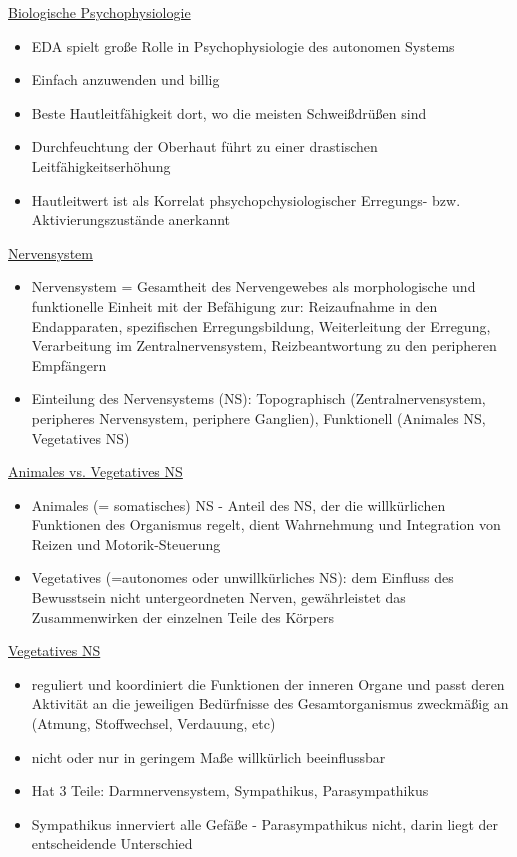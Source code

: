 \documentclass[a4paper,10pt,oneside]{article}
\begin{document}
\underline{Biologische Psychophysiologie} \\
 	\begin{itemize}
 		\item EDA spielt große Rolle in Psychophysiologie des autonomen Systems
 		\item Einfach anzuwenden und billig
 		\item Beste Hautleitfähigkeit dort, wo die meisten Schweißdrüßen sind 
 		\item Durchfeuchtung der Oberhaut führt zu einer drastischen Leitfähigkeitserhöhung
 		\item Hautleitwert ist als Korrelat phsychopchysiologischer Erregungs- bzw. Aktivierungszustände anerkannt
 	\end{itemize}
 		
\underline{Nervensystem} \\
 	\begin{itemize}
 		\item Nervensystem = Gesamtheit des Nervengewebes als morphologische und funktionelle Einheit mit der Befähigung zur: Reizaufnahme in den Endapparaten, spezifischen Erregungsbildung, Weiterleitung der Erregung, Verarbeitung im Zentralnervensystem, Reizbeantwortung zu den peripheren Empfängern
 		\item Einteilung des Nervensystems (NS): Topographisch (Zentralnervensystem, peripheres Nervensystem, periphere Ganglien), Funktionell (Animales NS, Vegetatives NS)
 	\end{itemize}

\underline{Animales vs. Vegetatives NS} \\
	\begin{itemize}
		\item Animales (= somatisches) NS - Anteil des NS, der die willkürlichen Funktionen des Organismus regelt, dient Wahrnehmung und Integration von Reizen und Motorik-Steuerung
		\item Vegetatives (=autonomes oder unwillkürliches NS): dem Einfluss des Bewusstsein nicht untergeordneten Nerven, gewährleistet das Zusammenwirken der einzelnen Teile des Körpers
	\end{itemize}
	
\underline{Vegetatives NS} \\
	\begin{itemize}
		\item reguliert und koordiniert die Funktionen der inneren Organe und passt deren Aktivität an die jeweiligen Bedürfnisse des Gesamtorganismus zweckmäßig an (Atmung, Stoffwechsel, Verdauung, etc)
		\item nicht oder nur in geringem Maße willkürlich beeinflussbar
		\item Hat 3 Teile: Darmnervensystem, Sympathikus, Parasympathikus
		\item Sympathikus innerviert alle Gefäße - Parasympathikus nicht, darin liegt der entscheidende Unterschied
	\end{itemize}
\end{document}
